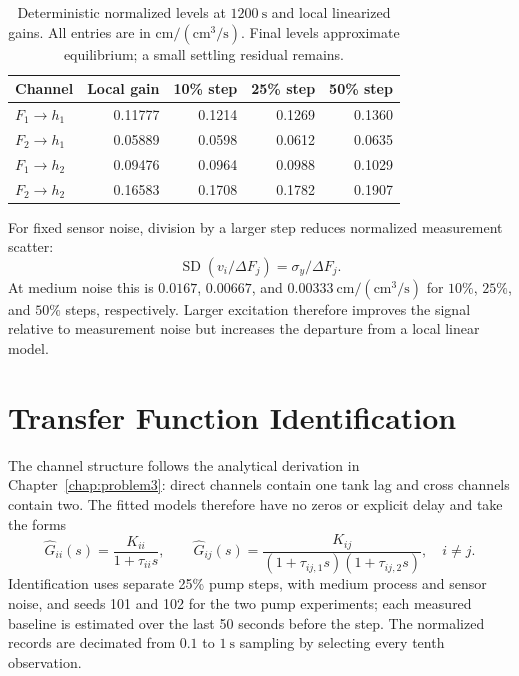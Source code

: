 \begin{table}[htbp]
 \centering
 \caption{Deterministic normalized levels at \(1200\ \mathrm{s}\) and local linearized gains. All entries are in \(\mathrm{cm/(cm^3/s)}\). Final levels approximate equilibrium; a small settling residual remains.}
 \label{tab:p4-gains}
 \begin{tabular}{lrrrr}
 \hline
 Channel & Local gain & 10\% step & 25\% step & 50\% step\\
 \hline
 \(F_1\to h_1\) & 0.11777 & 0.1214 & 0.1269 & 0.1360\\
 \(F_2\to h_1\) & 0.05889 & 0.0598 & 0.0612 & 0.0635\\
 \(F_1\to h_2\) & 0.09476 & 0.0964 & 0.0988 & 0.1029\\
 \(F_2\to h_2\) & 0.16583 & 0.1708 & 0.1782 & 0.1907\\
 \hline
 \end{tabular}
\end{table}

For fixed sensor noise, division by a larger step reduces normalized measurement scatter:
\[
\operatorname{SD}(v_i/\Delta F_j)=\sigma_y/\Delta F_j.
\]
At medium noise this is \(0.0167\), \(0.00667\), and \(0.00333\ \mathrm{cm/(cm^3/s)}\) for \(10\%\), \(25\%\), and \(50\%\) steps, respectively. Larger excitation therefore improves the signal relative to measurement noise but increases the departure from a local linear model.

\section{Transfer Function Identification}
\label{sec:4_4}

The channel structure follows the analytical derivation in
Chapter~\ref{chap:problem3}: direct channels contain one tank lag and
cross channels contain two. The fitted models therefore have no zeros
or explicit delay and take the forms
\begin{equation}
 \widehat G_{ii}(s)=\frac{K_{ii}}{1+\tau_{ii}s},\qquad
 \widehat G_{ij}(s)=\frac{K_{ij}}{(1+\tau_{ij,1}s)(1+\tau_{ij,2}s)},\quad i\ne j.
\end{equation}
Identification uses separate 25\% pump steps, with medium process and
sensor noise, and seeds 101 and 102 for the two pump experiments; each
measured baseline is estimated over the last 50 seconds before the
step. The normalized records are decimated from $0.1$ to $1\ \mathrm{s}$
sampling by selecting every tenth observation.

